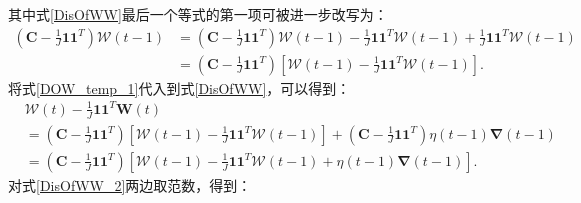 其中式\eqref{DisOfWW}最后一个等式的第一项可被进一步改写为：
\begin{equation}
    \label{DOW_temp_1}
    \begin{split}
        \left(\boldsymbol C-\frac{1}{J}\boldsymbol1\boldsymbol1^T\right)\boldsymbol{\mathcal{W}}\left(t-1\right)
        &=\left(\boldsymbol C-\frac{1}{J}\boldsymbol1\boldsymbol1^T\right)\boldsymbol{\mathcal{W}}\left(t-1\right)
        - \frac{1}{J}\boldsymbol1\boldsymbol1^T\boldsymbol {\mathcal{W}}\left(t-1\right) 
        + \frac{1}{J}\boldsymbol1\boldsymbol1^T\boldsymbol {\mathcal{W}}\left(t-1\right) \\
        &=\left(\boldsymbol C-\frac{1}{J}\boldsymbol1\boldsymbol1^T\right)
        \left[\boldsymbol{\mathcal{W}}\left(t-1\right) - \frac{1}{J}\boldsymbol1\boldsymbol1^T\boldsymbol{\mathcal{W}}\left(t-1\right)\right].
    \end{split}
\end{equation}
将式\eqref{DOW_temp_1}代入到式\eqref{DisOfWW}，可以得到：
\begin{equation}
    \label{DisOfWW_2}
    \begin{split}
        &\boldsymbol{\mathcal{W}}\left(t\right) - \frac{1}{J}\boldsymbol1\boldsymbol1^T\boldsymbol W\left(t\right)   \\
        &=\left(\boldsymbol C-\frac{1}{J}\boldsymbol1\boldsymbol1^T\right)
        \left[\boldsymbol{\mathcal{W}}\left(t-1\right) - \frac{1}{J}\boldsymbol1\boldsymbol1^T\boldsymbol{\mathcal{W}}\left(t-1\right)\right]
        +\left(\boldsymbol C-\frac{1}{J}\boldsymbol1\boldsymbol1^T\right)\eta\left(t-1\right)\boldsymbol{\nabla}\left(t-1\right)    \\
        &= \left(\boldsymbol C-\frac{1}{J}\boldsymbol1\boldsymbol1^T\right) \left[
            \boldsymbol{\mathcal{W}}\left(t-1\right) - \frac{1}{J}\boldsymbol1\boldsymbol1^T\boldsymbol{\mathcal{W}}\left(t-1\right)
            +\eta\left(t-1\right)\boldsymbol{\nabla}\left(t-1\right)
        \right].
    \end{split}
\end{equation}
对式\eqref{DisOfWW_2}两边取范数，得到：
